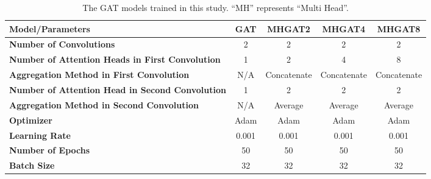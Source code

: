 \begin{table*}[htb!]
    \centering
    \begin{tabular}{|l c c c c|}
        \hline
        \textbf{Model/Parameters} & \textbf{GAT} & \textbf{MHGAT2} & \textbf{MHGAT4} & \textbf{MHGAT8}\\
        \hline
        \textbf{Number of Convolutions} & 2 & 2 & 2 & 2\\
        \textbf{Number of Attention Heads in First Convolution} & 1 & 2 & 4 & 8\\
        \textbf{Aggregation Method in First Convolution} & N/A & Concatenate & Concatenate & Concatenate\\
        \textbf{Number of Attention Head in Second Convolution} & 1 & 2 & 2 & 2\\
        \textbf{Aggregation Method in Second Convolution} & N/A & Average & Average & Average\\
        \textbf{Optimizer} & Adam & Adam & Adam & Adam\\
        \textbf{Learning Rate} & 0.001 & 0.001 & 0.001 & 0.001\\
        \textbf{Number of Epochs} & 50 & 50 & 50 & 50\\
        \textbf{Batch Size} & 32 & 32 & 32 & 32\\
        \hline
    \end{tabular}
    \caption{The GAT models trained in this study. “MH” represents “Multi Head”.}
    \label{tab:gat-models}
\end{table*}